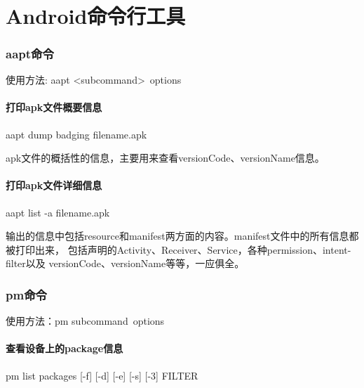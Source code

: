 ﻿\documentclass[a4paper,10pt]{article}
\author{孙延宾}
\date{\today}
\begin{document}
  \tt
  \begin{titlepage}
    \maketitle
  \end{titlepage}

  \part[Commands for Android]{Android命令行工具}
  \section[aapt - Android Asset Packaging Tool]{aapt命令}
  使用方法: aapt \textless subcommand\textgreater\ \lt options\gt
  \subsection[print apk file badging information]{打印apk文件概要信息}
  aapt dump badging filename.apk

  apk文件的概括性的信息，主要用来查看versionCode、versionName信息。

  \subsection[print apk file verbose information]{打印apk文件详细信息}
  aapt list -a filename.apk

  输出的信息中包括resource和manifest两方面的内容。manifest文件中的所有信息都被打印出来，
  包括声明的Activity、Receiver、Service，各种permission、intent-filter以及
  versionCode、versionName等等，一应俱全。

  \section[pm - Package Manager]{pm命令}
  使用方法：pm \lt subcommand\gt\ \lt options\gt

  \subsection[list packages]{查看设备上的package信息}
  pm list packages [-f] [-d] [-e] [-s] [-3] FILTER
\end{document}
